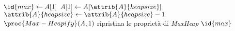 \begin{codebox}
\li $\id{max} \gets A[1]$
\li $A[1] \gets A[\attrib{A}{heapsize}]$
\li $\attrib{A}{heapsize} \gets \attrib{A}{heapsize} - 1$
\li $\proc{Max-Heapify}(A,1)$
    	\Comment ripristina le proprietà di \emph{MaxHeap}
\li \Return $\id{max}$
\end{codebox}